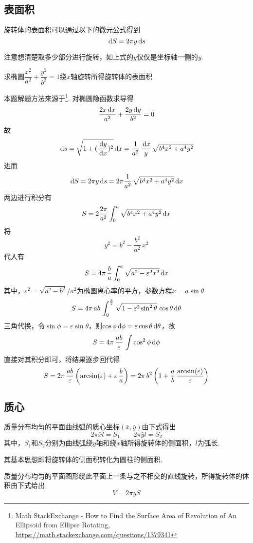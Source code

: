 \subsection{表面积}
旋转体的表面积可以通过以下的微元公式得到
\[\,\mathrm{d} S=2\pi y\,\mathrm{d} s\]
\par 注意想清楚取多少部分进行旋转，如上式的$y$仅仅是坐标轴一侧的$y$.
\begin{example}
求椭圆$\dfrac{x^2}{a^2}+\dfrac{y^2}{b^2}=1$绕$x$轴旋转所得旋转体的表面积
\end{example}
\begin{analysis}
本题解题方法来源于\footnote{Math StackExchange - How to Find the Surface Area of Revolution of An Ellipsoid from Ellipse Rotating, \url{https://math.stackexchange.com/questions/1379341}}.
对椭圆隐函数求导得
\[\frac{2x\,\mathrm{d} x}{a^2} + \frac{2y\,\mathrm{d} y}{b^2} = 0\]
故
\[\,\mathrm{d} s = \sqrt{1 + (\frac{\,\mathrm{d} y}{\,\mathrm{d} x})^2}\,\mathrm{d} x = \frac{1}{a^2}\,\frac{\,\mathrm{d} x}{y}\,\sqrt{b^4x^2 + a^4y^2}\]
进而
\[\,\mathrm{d} S = 2\pi y\,\mathrm{d} s=2\pi \frac{1}{a^2}\,\sqrt{b^4x^2 + a^4y^2}\,\mathrm{d} x\]
两边进行积分有
\[S = 2\frac{2\pi}{a^2}\int_{0}^{a} \sqrt{b^4x^2 + a^4y^2}\,\mathrm{d} x\]
将
\[y^2 = b^2 - \frac{b^2}{a^2}\,x^2\]
代入有
\[S = 4\pi\,\frac{b}{a}\int_{0}^{a} \sqrt{a^2 - \varepsilon^2x^2}\,\mathrm{d} x\]
其中，$\varepsilon^2=\sqrt{a^2-b^2}\Big/a^2$为椭圆离心率的平方，参数方程$x=a\sin\theta$
\[S = 4\pi\,ab\,\int_{0}^{\frac{\pi}{2}} \sqrt{1 - \varepsilon^2\sin^2\theta}\,\cos\theta\,\mathrm{d}\theta\]
三角代换，令$\sin\phi = \varepsilon\sin\theta$，则$\cos\phi\,\mathrm{d}\phi = \varepsilon\cos\theta\,\mathrm{d}\theta$，故
\[S = 4\pi\,\frac{ab}{\varepsilon}\,\int\cos^2\phi\,\mathrm{d}\phi\]
直接对其积分即可，将结果逐步回代得
\[S = 
2\pi\,\frac{ab}{\varepsilon}\left(\arcsin(\varepsilon) + \varepsilon\,\frac{b}{a}\right)= 
2\pi\,b^2\left(1 + \frac{a}{b}\,\frac{\arcsin(\varepsilon)}{\varepsilon}\right)\]
\end{analysis}

\subsection{质心}
\begin{theorem}
质量分布均匀的平面曲线弧的质心坐标$(\bar{x},\bar{y})$由下式得出
\[2\pi\bar{x}l=S_1\qquad 2\pi\bar{y}l=S_2\]
其中，$S_1$和$S_2$分别为曲线弧绕$y$轴和绕$x$轴所得旋转体的侧面积，$l$为弧长.
\end{theorem}
其基本思想即将旋转体的侧面积转化为圆柱的侧面积.
\begin{theorem}[古鲁金第二定理]
质量分布均匀的平面图形绕此平面上一条与之不相交的直线旋转，所得旋转体的体积由下式给出
\[V=2\pi\bar{y}S\]
\end{theorem}


